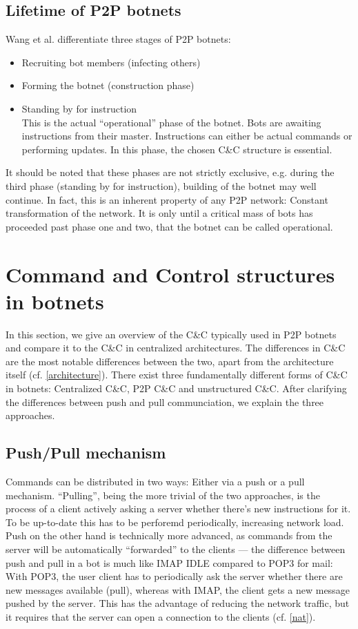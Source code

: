 \documentclass{llncs}
\begin{document}
\subsection{Lifetime of P2P botnets}
Wang et al.\cite{wang2009systematic} differentiate three stages of P2P botnets:
\begin{itemize}
\item Recruiting bot members (infecting others)
\item Forming the botnet (construction phase)
\item Standing by for instruction \\
This is the actual ``operational'' phase of the botnet. Bots are awaiting instructions from their master. Instructions can either be actual commands or performing updates. In this phase, the chosen C\&C structure is essential.
\end{itemize}
It should be noted that these phases are not strictly exclusive,
e.g. during the third phase (standing by for instruction), building of
the botnet may well continue. In fact, this is an inherent property of
any P2P network: Constant transformation of the network. It is only
until a critical mass of bots has proceeded past phase one and two,
that the botnet can be called operational.


\section{Command and Control structures in botnets}
In this section, we give an overview of the C\&C typically used in P2P
botnets and compare it to the C\&C in centralized architectures. The
differences in C\&C are the most notable differences between the two,
apart from the architecture itself (cf. \ref{architecture}). There
exist three fundamentally different forms of C\&C in botnets:
Centralized C\&C, P2P C\&C and unstructured C\&C. After clarifying the
differences between push and pull communciation, we explain the three
approaches.


\subsection{Push/Pull mechanism}
\label{pushpull}
Commands can be distributed in two ways: Either via a push or a pull
mechanism. ``Pulling'', being the more trivial of the two approaches,
is the process of a client actively asking a server whether there's
new instructions for it. To be up-to-date this has to be perforemd
periodically, increasing network load.  Push on the other hand is
technically more advanced, as commands from the server will be
automatically ``forwarded'' to the clients --- the difference between
push and pull in a bot is much like IMAP IDLE compared to POP3 for
mail: With POP3, the user client has to periodically ask the server
whether there are new messages available (pull), whereas with IMAP,
the client gets a new message pushed by the server. This has the
advantage of reducing the network traffic, but it requires that the
server can open a connection to the clients (cf. \ref{nat}).
\end{document}
